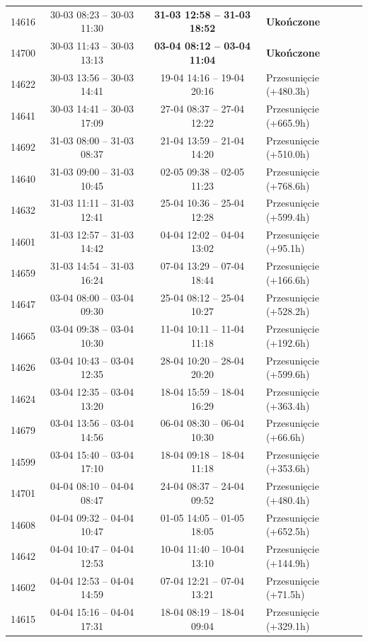 \begin{table}[htbp]
\begin{tabular}{|r|c|c|l|}
14616 & 30-03 08:23 -- 30-03 11:30 & \textbf{31-03 12:58 -- 31-03 18:52} & \textbf{Ukończone} \\ 
14700 & 30-03 11:43 -- 30-03 13:13 & \textbf{03-04 08:12 -- 03-04 11:04} & \textbf{Ukończone} \\ 
14622 & 30-03 13:56 -- 30-03 14:41 & 19-04 14:16 -- 19-04 20:16 & Przesunięcie (+480.3h) \\ 
14641 & 30-03 14:41 -- 30-03 17:09 & 27-04 08:37 -- 27-04 12:22 & Przesunięcie (+665.9h) \\ 
14692 & 31-03 08:00 -- 31-03 08:37 & 21-04 13:59 -- 21-04 14:20 & Przesunięcie (+510.0h) \\ 
14640 & 31-03 09:00 -- 31-03 10:45 & 02-05 09:38 -- 02-05 11:23 & Przesunięcie (+768.6h) \\ 
14632 & 31-03 11:11 -- 31-03 12:41 & 25-04 10:36 -- 25-04 12:28 & Przesunięcie (+599.4h) \\ 
14601 & 31-03 12:57 -- 31-03 14:42 & 04-04 12:02 -- 04-04 13:02 & Przesunięcie (+95.1h) \\ 
14659 & 31-03 14:54 -- 31-03 16:24 & 07-04 13:29 -- 07-04 18:44 & Przesunięcie (+166.6h) \\ 
14647 & 03-04 08:00 -- 03-04 09:30 & 25-04 08:12 -- 25-04 10:27 & Przesunięcie (+528.2h) \\ 
14665 & 03-04 09:38 -- 03-04 10:30 & 11-04 10:11 -- 11-04 11:18 & Przesunięcie (+192.6h) \\ 
14626 & 03-04 10:43 -- 03-04 12:35 & 28-04 10:20 -- 28-04 20:20 & Przesunięcie (+599.6h) \\ 
14624 & 03-04 12:35 -- 03-04 13:20 & 18-04 15:59 -- 18-04 16:29 & Przesunięcie (+363.4h) \\ 
14679 & 03-04 13:56 -- 03-04 14:56 & 06-04 08:30 -- 06-04 10:30 & Przesunięcie (+66.6h) \\ 
14599 & 03-04 15:40 -- 03-04 17:10 & 18-04 09:18 -- 18-04 11:18 & Przesunięcie (+353.6h) \\ 
14701 & 04-04 08:10 -- 04-04 08:47 & 24-04 08:37 -- 24-04 09:52 & Przesunięcie (+480.4h) \\ 
14608 & 04-04 09:32 -- 04-04 10:47 & 01-05 14:05 -- 01-05 18:05 & Przesunięcie (+652.5h) \\ 
14642 & 04-04 10:47 -- 04-04 12:53 & 10-04 11:40 -- 10-04 13:10 & Przesunięcie (+144.9h) \\ 
14602 & 04-04 12:53 -- 04-04 14:59 & 07-04 12:21 -- 07-04 13:21 & Przesunięcie (+71.5h) \\ 
14615 & 04-04 15:16 -- 04-04 17:31 & 18-04 08:19 -- 18-04 09:04 & Przesunięcie (+329.1h) \\ 

\end{tabular}
\end{table}
